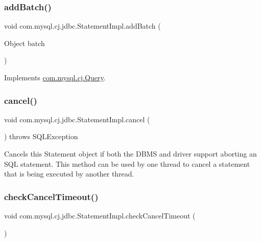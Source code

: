 \subsubsection{\texorpdfstring{add\+Batch()}{addBatch()}\hspace{0.1cm}{\footnotesize\ttfamily [2/2]}}
{\footnotesize\ttfamily void com.\+mysql.\+cj.\+jdbc.\+Statement\+Impl.\+add\+Batch (\begin{DoxyParamCaption}\item[{Object}]{batch }\end{DoxyParamCaption})}



Implements \mbox{\hyperlink{interfacecom_1_1mysql_1_1cj_1_1_query_a726941dcc741acae509b16f14730966a}{com.\+mysql.\+cj.\+Query}}.

\mbox{\label{classcom_1_1mysql_1_1cj_1_1jdbc_1_1_statement_impl_a89d3ae6ba7d634b3a5aa0b9014b2cf80}} 
\subsubsection{\texorpdfstring{cancel()}{cancel()}}
{\footnotesize\ttfamily void com.\+mysql.\+cj.\+jdbc.\+Statement\+Impl.\+cancel (\begin{DoxyParamCaption}{ }\end{DoxyParamCaption}) throws S\+Q\+L\+Exception}

Cancels this Statement object if both the D\+B\+MS and driver support aborting an S\+QL statement. This method can be used by one thread to cancel a statement that is being executed by another thread. \mbox{\label{classcom_1_1mysql_1_1cj_1_1jdbc_1_1_statement_impl_a8409855892d4f4c55a35f3444f50825c}} 
\subsubsection{\texorpdfstring{check\+Cancel\+Timeout()}{checkCancelTimeout()}}
{\footnotesize\ttfamily void com.\+mysql.\+cj.\+jdbc.\+Statement\+Impl.\+check\+Cancel\+Timeout (\begin{DoxyParamCaption}{ }\end{DoxyParamCaption})}



